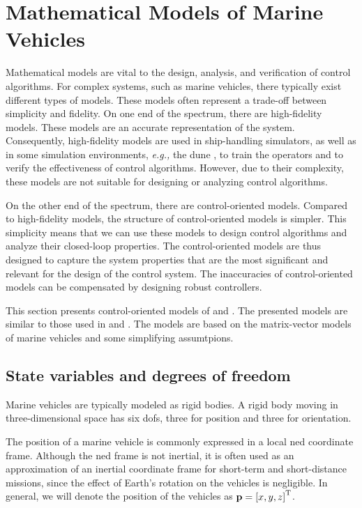 \section{Mathematical Models of Marine Vehicles}
\label{sec:model}

Mathematical models are vital to the design, analysis, and verification of control algorithms.
For complex systems, such as marine vehicles, there typically exist different types of models.
These models often represent a trade-off between simplicity and fidelity.
On one end of the spectrum, there are high-fidelity models.
These models are an accurate representation of the system.
Consequently, high-fidelity models are used in ship-handling simulators, as well as in some simulation environments, \emph{e.g.,} the \gls{dune} \cite{dune}, to train the operators and to verify the effectiveness of control algorithms.
However, due to their complexity, these models are not suitable for designing or analyzing control algorithms.

On the other end of the spectrum, there are control-oriented models.
Compared to high-fidelity models, the structure of control-oriented models is simpler.
This simplicity means that we can use these models to design control algorithms and analyze their closed-loop properties.
The control-oriented models are thus designed to capture the system properties that are the most significant and relevant for the design of the control system.
The inaccuracies of control-oriented models can be compensated by designing robust controllers.

This section presents control-oriented models of  and .
The presented models are similar to those used in \cite{borhaug_straight_2007} and \cite{fredriksen_global_2006}.
The models are based on the matrix-vector models of marine vehicles \cite{fossen_handbook_2011} and some simplifying assumtpions.

\subsection{State variables and degrees of freedom}
Marine vehicles are typically modeled as rigid bodies.
A rigid body moving in three-dimensional space has six \glspl{dof}, three for position and three for orientation.

The position of a marine vehicle is commonly expressed in a local \gls{ned} coordinate frame.
Although the \gls{ned} frame is not inertial, it is often used as an approximation of an inertial coordinate frame for short-term and short-distance missions, since the effect of Earth's rotation on the vehicles is negligible.
In general, we will denote the position of the vehicles as $\mathbf{p} = \left[x, y, z\right]^{\mathrm{T}}$.


